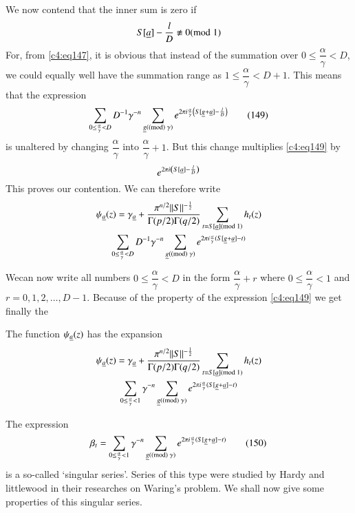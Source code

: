 We now contend that the inner sum is zero if
$$
S[\underline{a}]-\frac{l}{D}\not\equiv 0(\rm{mod} \; 1)
$$
For, from \eqref{c4:eq147}, it is obvious that instead of the summation
over $0\leq \dfrac{\alpha}{\gamma}<D$, we could equally well have the
summation range as $1\leq \dfrac{\alpha}{\gamma}<D+1$. This means that
the expression
\begin{equation*}
\sum_{0\leq
  \frac{\alpha}{\gamma}<D}D^{-1}\gamma^{-n}\sum_{\underline{g}(\rm(mod) \; \gamma)}e^{2\pi
  i\frac{\alpha}{\gamma}\left(S[\underline{g}+\underline{a}]-\frac{l}{D}\right)}
\tag{149}\label{c4:eq149} 
\end{equation*}
is unaltered by changing $\dfrac{\alpha}{\gamma}$ into
$\dfrac{\alpha}{\gamma}+1$. But this change multiplies \eqref{c4:eq149} by
$$
e^{2\pi i\left(S[\underline{a}]-\frac{l}{D}\right)} 
$$
This proves our contention. We can therefore write
\begin{gather*}
\psi_{\underline{a}}(z) =
\gamma_{\underline{a}}+\dfrac{\pi^{n/2}||S||^{-\frac{1}{2}}}{\Gamma(p/2)\Gamma(q/2)}\sum_{t\equiv
  S[\underline{a}](\rm{mod} \; 1)}h_{t}(z)\\ 
\sum_{0\leq
  \frac{\alpha}{\gamma}<D}D^{-1}\gamma^{-n}\sum_{\underline{g}(\rm(mod) \; \gamma)}e^{2\pi
  i\frac{\alpha}{\gamma}(S[\underline{g}+\underline{a}]-t)}
\end{gather*}

We\pageoriginale can now write all numbers $0\leq
\dfrac{\alpha}{\gamma}<D$ in the form $\dfrac{\alpha}{\gamma}+r$ where
$0\leq \dfrac{\alpha}{\gamma}<1$ and $r=0,1,2,\ldots,D-1$. Because of
the property of the expression \eqref{c4:eq149} we get finally the

\begin{thm}\label{chap4:thm10}
The function $\psi_{\underline{a}}(z)$ has the expansion
\begin{gather*}
\psi_{\underline{a}}(z)=\gamma_{\underline{a}}+\frac{\pi^{n/2}||S||^{-\frac{1}{2}}}{\Gamma(p/2)\Gamma(q/2)}\sum_{t\equiv
  S[\underline{a}](\rm{mod} \; 1)}h_{t}(z)\\
\sum_{0\leq
  \frac{\alpha}{\gamma}<1}\gamma^{-n}\sum_{\underline{g}(\rm(mod) \; \gamma)}e^{2\pi
  i\frac{\alpha}{\gamma}(S[\underline{g}+\underline{a}]-t)} 
\end{gather*}
\end{thm}

The expression
\begin{equation*}
\beta_{t}=\sum_{0\leq
  \frac{\alpha}{\gamma}<1}\gamma^{-n}\sum_{\underline{g}(\rm(mod) \; \gamma)}e^{2\pi i\frac{\alpha}{\gamma}(S[\underline{g}+\underline{a}]-t)}\tag{150}\label{c4:eq150}
\end{equation*}
is a so-called `singular series'. Series of this type were studied by
Hardy and littlewood in their researches on Waring's problem. We shall
now give some properties of this singular series. 


